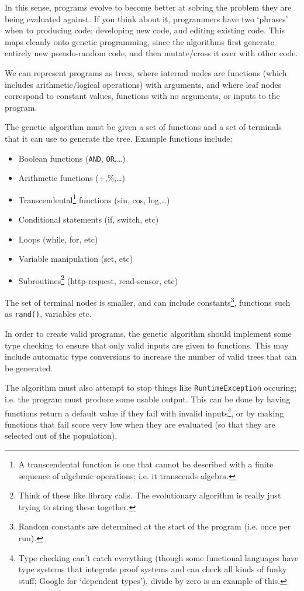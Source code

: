 In this sense, programs evolve to become better at solving the problem
they are being evaluated against. If you think about it, programmers
have two `phrases' when to producing code; developing new code, and
editing existing code. This maps cleanly onto genetic programming,
since the algorithms first generate entirely new pseudo-random code,
and then mutate/cross it over with other code.

We can represent programs as trees, where internal nodes are functions
(which includes arithmetic/logical operations) with arguments, and
where leaf nodes correspond to constant values, functions with no
arguments, or inputs to the program.

The genetic algorithm must be given a set of functions and a set of
terminals that it can use to generate the tree. Example functions
include:

\begin{itemize}
\item Boolean functions (\texttt{AND}, \texttt{OR},\dots)
\item Arithmetic functions ($+$,$\%$,\dots)
\item Transcendental\footnote{A transcendental function is one that
cannot be described with a finite sequence of algebraic operations;
i.e. it transcends algebra.} functions (sin, cos, log,\dots)
\item Conditional statements (if, switch, etc)
\item Loops (while, for, etc)
\item Variable manipulation (set, etc)
\item Subroutines\footnote{Think of these like library calls. The
evolutionary algorithm is really just trying to string these
together.} (http-request, read-sensor, etc)
\end{itemize}

The set of terminal nodes is smaller, and can include
constants\footnote{Random constants are determined at the start of the
program (i.e. once per run).}, functions such as \texttt{rand()},
variables etc.

In order to create valid programs, the genetic algorithm should
implement some type checking to ensure that only valid inputs are
given to functions. This may include automatic type conversions to
increase the number of valid trees that can be generated.

The algorithm must also attempt to stop things
like \texttt{RuntimeException} occuring; i.e. the program must produce
some usable output. This can be done by having functions return a
default value if they fail with invalid inputs\footnote{Type checking
can't catch everything (though some functional languages have type
systems that integrate proof systems and can check all kinds of funky
stuff; Google for `dependent types'), divide by zero is an example of
this.}, or by making functions that fail score very low when they are
evaluated (so that they are selected out of the population).

